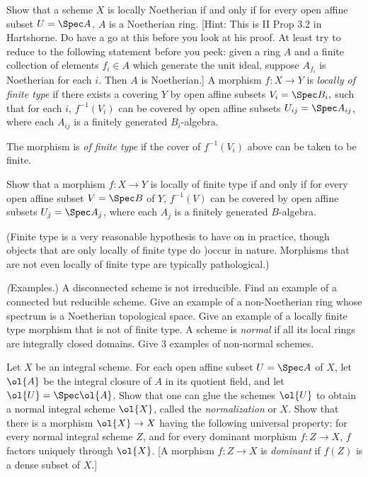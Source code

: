 \begin{homework}[e]
	Show that a scheme $X$ is locally Noetherian if and only if for every open affine subset $U = \Spec A$, $A$ is a Noetherian ring.  [Hint: This is II Prop 3.2 in Hartshorne. Do have a go at this before you look at his proof. At least try to reduce to the following statement before you peek: given a ring $A$ and a finite collection of elements $f_i \in A$ which generate the unit ideal, suppose $A_{f_i}$ is Noetherian for each $i$. Then $A$ is Noetherian.]
	 A morphism $f:X\to Y$ is \textit{locally of finite type} if there exists a covering $Y$ by open affine subsets $V_i = \Spec B_i,$ such that for each $i$, $f^{-1}(V_i)$ can be covered by open affine subsets $U_{ij} = \Spec A_{ij}$, where each $A_{ij}$ is a finitely generated $B_i$-algebra.

	\noindent The morphism is \textit{of finite type} if the cover of $f^{-1}(V_i)$ above can be taken to be finite.

	\noindent Show that a morphism $f:X\to Y$ is locally of finite type if and only if for every open affine subset $V = \Spec B$ of $Y$, $f^{-1}(V)$ can be covered by open affine subsets $U_j = \Spec A_j$, where each $A_j$ is a finitely generated $B$-algebra. 

	\noindent (Finite type is a very reasonable hypothesis to have on in practice, though objects that are only locally of finite type do )occur in nature. Morphisms that are not even locally of finite type are typically pathological.)

	 \textit(Examples.) A disconnected scheme is not irreducible. Find an example of a connected but reducible scheme. Give an example of a non-Noetherian ring whose spectrum is a Noetherian topological space. Give an example of a locally finite type morphism that is not of finite type. 
	 A scheme is \textit{normal} if all its local rings are integrally closed domains. Give 3 examples of non-normal schemes. 
	
	\bigskip

	\noindent Let $X$ be an integral scheme. For each open affine subset $U = \Spec A$ of $X$, let $\ol{A}$ be the integral closure of $A$ in its quotient field, and let $\ol{U} = \Spec \ol{A}$. Show that one can glue the schemes $\ol{U}$ to obtain a normal integral scheme $\ol{X}$, called the \textit{normalization} or $X$. Show that there is a morphism $\ol{X} \to X$ having the following universal property: for every normal integral scheme $Z$, and for every dominant morphism $f:Z\to X$, $f$ factors uniquely through $\ol{X}$. [A morphism $f:Z \to X$ is \textit{dominant} if $f(Z)$ is a dense subset of $X$.]
\end{homework}
\newpage


